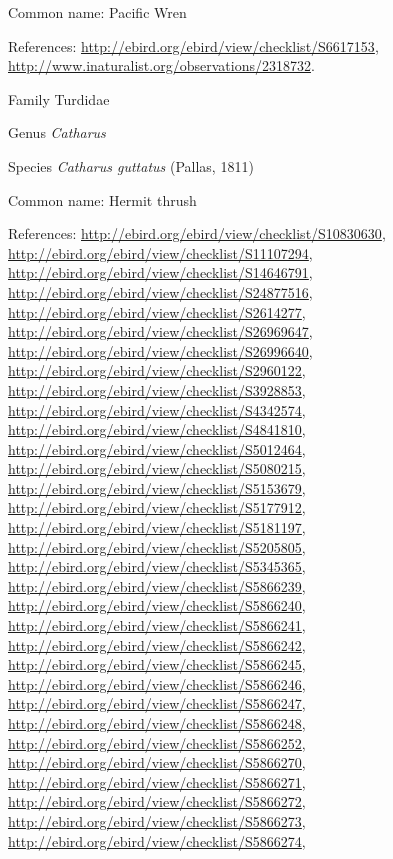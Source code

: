 \documentclass[9pt, article]{memoir}
\begin{document}
\begin{multicols}{2}
Common name: Pacific Wren

References: 
\url{http://ebird.org/ebird/view/checklist/S6617153}, 
\url{http://www.inaturalist.org/observations/2318732}.

\vspace{6pt}\noindent\hspace{24pt}Family Turdidae


\vspace{6pt}\noindent\hspace{30pt}Genus \textit{Catharus}


\vspace{6pt}\noindent\hspace{36pt}Species \textit{Catharus guttatus} (Pallas, 1811)


Common name: Hermit thrush

References: 
\url{http://ebird.org/ebird/view/checklist/S10830630}, 
\url{http://ebird.org/ebird/view/checklist/S11107294}, 
\url{http://ebird.org/ebird/view/checklist/S14646791}, 
\url{http://ebird.org/ebird/view/checklist/S24877516}, 
\url{http://ebird.org/ebird/view/checklist/S2614277}, 
\url{http://ebird.org/ebird/view/checklist/S26969647}, 
\url{http://ebird.org/ebird/view/checklist/S26996640}, 
\url{http://ebird.org/ebird/view/checklist/S2960122}, 
\url{http://ebird.org/ebird/view/checklist/S3928853}, 
\url{http://ebird.org/ebird/view/checklist/S4342574}, 
\url{http://ebird.org/ebird/view/checklist/S4841810}, 
\url{http://ebird.org/ebird/view/checklist/S5012464}, 
\url{http://ebird.org/ebird/view/checklist/S5080215}, 
\url{http://ebird.org/ebird/view/checklist/S5153679}, 
\url{http://ebird.org/ebird/view/checklist/S5177912}, 
\url{http://ebird.org/ebird/view/checklist/S5181197}, 
\url{http://ebird.org/ebird/view/checklist/S5205805}, 
\url{http://ebird.org/ebird/view/checklist/S5345365}, 
\url{http://ebird.org/ebird/view/checklist/S5866239}, 
\url{http://ebird.org/ebird/view/checklist/S5866240}, 
\url{http://ebird.org/ebird/view/checklist/S5866241}, 
\url{http://ebird.org/ebird/view/checklist/S5866242}, 
\url{http://ebird.org/ebird/view/checklist/S5866245}, 
\url{http://ebird.org/ebird/view/checklist/S5866246}, 
\url{http://ebird.org/ebird/view/checklist/S5866247}, 
\url{http://ebird.org/ebird/view/checklist/S5866248}, 
\url{http://ebird.org/ebird/view/checklist/S5866252}, 
\url{http://ebird.org/ebird/view/checklist/S5866270}, 
\url{http://ebird.org/ebird/view/checklist/S5866271}, 
\url{http://ebird.org/ebird/view/checklist/S5866272}, 
\url{http://ebird.org/ebird/view/checklist/S5866273}, 
\url{http://ebird.org/ebird/view/checklist/S5866274}, 

\end{multicols}
\end{document}
